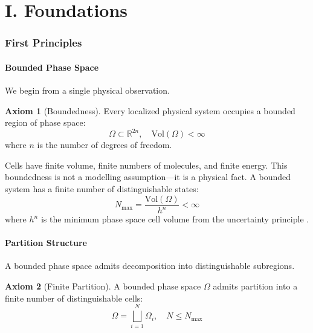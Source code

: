 \documentclass[10pt,twocolumn,a4paper]{article}
\theoremstyle{plain}
\theoremstyle{definition}
\newtheorem{axiom}{Axiom}
\theoremstyle{remark}
\newcommand{\R}{\mathbb{R}}
\begin{document}
\part*{I. Foundations}

\section{First Principles}
\label{sec:foundations}

\subsection{Bounded Phase Space}

We begin from a single physical observation.

\begin{axiom}[Boundedness]
\label{ax:bounded}
Every localized physical system occupies a bounded region of phase space:
\begin{equation}
    \Omega \subset \R^{2n}, \quad \mathrm{Vol}(\Omega) < \infty
\end{equation}
where $n$ is the number of degrees of freedom.
\end{axiom}

Cells have finite volume, finite numbers of molecules, and finite energy. This boundedness is not a modelling assumption---it is a physical fact. A bounded system has a finite number of distinguishable states:
\begin{equation}
    N_{\max} = \frac{\mathrm{Vol}(\Omega)}{h^n} < \infty
\end{equation}
where $h^n$ is the minimum phase space cell volume from the uncertainty principle \citep{landau1980}.

\subsection{Partition Structure}

A bounded phase space admits decomposition into distinguishable subregions.

\begin{axiom}[Finite Partition]
\label{ax:partition}
A bounded phase space $\Omega$ admits partition into a finite number of distinguishable cells:
\begin{equation}
    \Omega = \bigsqcup_{i=1}^{N} \Omega_i, \quad N \leq N_{\max}
\end{equation}
\end{axiom}
\end{document}
